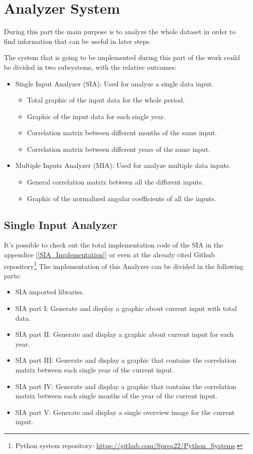 
\chapter{Analyzer System}
\label{AnalyzerSystem}
During this part the main purpose is to analyze the whole dataset in order to find information that can be useful in later steps. 

The system that is going to be implemented during this part of the work could be divided in two subsystems, with the relative outcomes:
\begin{itemize}
\item Single Input Analyzer (SIA): Used for analyze a single data input.
\begin{itemize}
\item Total graphic of the input data for the whole period.
\item Graphic of the input data for each single year.
\item Correlation matrix between different months of the same input.
\item Correlation matrix between different years of the same input.
\end{itemize}
\item Multiple Inputs Analyzer (MIA): Used for analyze multiple data inputs.
\begin{itemize}
\item General correlation matrix between all the different inputs.

\item Graphic of the normalized angular coefficients of all the inputs.
\end{itemize}
\end{itemize}

\newpage


\section{Single Input Analyzer}
It's possible to check out the total implementation code of the SIA in the appendice  [\ref{SIA_Implementation}] or even at the already cited Github repository\footnote{Python system repository: \url{https://github.com/Sprea22/Python_Systems}.
}
The implementation of this Analyzer can be divided in the following parts:
\begin{itemize}
\item SIA imported libraries. 
\item SIA part I: Generate and display a graphic about current input with total data.
\item SIA part II: Generate and display a graphic about current input for each year.
\item SIA part III: Generate and display a graphic that contains the correlation matrix between each single year of the current input.
\item SIA part IV: Generate and display a graphic that contains the correlation matrix between each single months of the year of the current input.
\item SIA part V: Generate and display a single overview image for the current input.
\end{itemize}

